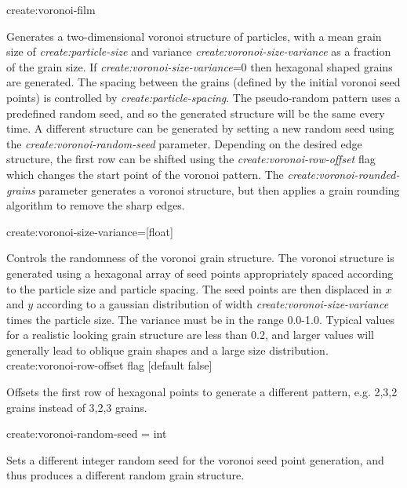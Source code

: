 {\zicf create:voronoi-film} Generates a two-dimensional voronoi structure of particles, with a mean grain size of \textit{create:particle-size} and variance \textit{create:voronoi-size-variance} as a fraction of the grain size. If \textit{create:voronoi-size-variance}=0 then hexagonal shaped grains are generated. The spacing between the grains (defined by the initial voronoi seed points) is controlled by \textit{create:particle-spacing}. The pseudo-random pattern uses a predefined random seed, and so the generated structure will be the same every time. A different structure can be generated by setting a new random seed using the \textit{create:voronoi-random-seed} parameter. Depending on the desired edge structure, the first row can be shifted using the \textit{create:voronoi-row-offset} flag which changes the start point of the voronoi pattern. The \textit{create:voronoi-rounded-grains} parameter generates a voronoi structure, but then applies a grain rounding algorithm to remove the sharp edges.\\ \par

{\zicf create:voronoi-size-variance=[float]} Controls the randomness of the voronoi grain structure. The voronoi structure is generated using a hexagonal array of seed points appropriately spaced according to the particle size and particle spacing. The seed points are then displaced in $x$ and $y$ according to a gaussian distribution of width \textit{create:voronoi-size-variance} times the particle size. The variance must be in the range 0.0-1.0. Typical values for a realistic looking grain structure are less than 0.2, and larger values will generally lead to oblique grain shapes and a large size distribution.\\

{\zicf create:voronoi-row-offset flag [default false]} Offsets the first row of hexagonal points to generate a different pattern, e.g. 2,3,2 grains instead of 3,2,3 grains.\\ \par

{\zicf create:voronoi-random-seed = int} Sets a different integer random seed for the voronoi seed point generation, and thus produces a different random grain structure.\\ \par

